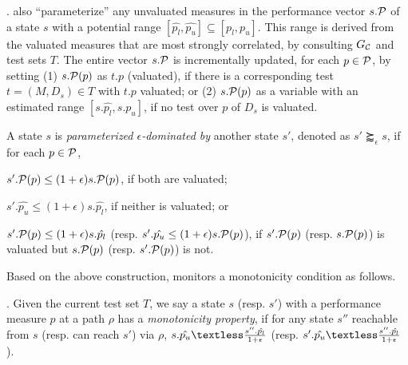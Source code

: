 


. 
\bimodis also ``parameterize'' any unvaluated measures in the performance vector $s.\P$ 
of a state $s$ with a potential range $[\hat{p_l}, \hat{p_u}]\subseteq [p_l, p_u]$. This range is derived from the 
valuated measures that are most strongly correlated, by consulting $G_\C$ and test sets $T$. 
The entire vector $s.\P$ is incrementally 
updated, for each $p\in \P$, by setting 
(1) $s.\P(p)$ as $t.p$ (valuated), if there is a corresponding test $t=(M, D_s)\in T$ with $t.p$ valuated; or (2) $s.\P(p)$ as a variable with an estimated range $[s.\hat{p_l}, s.\hat{p_u}]$, if no test over $p$ of $D_s$ is valuated.
 
A state $s$ is {\em parameterized $\epsilon$-dominated by} another state $s'$, denoted as $s' \succapprox_{\epsilon} s$,  if for each $p \in \P$, 
\tbi
\item $s'.\P(p)\leq (1+\epsilon) s.\P(p)$, if both 
are valuated; 
\item $s'.\hat{p_u} \leq (1+\epsilon) s.\hat{p_l}$, if neither 
is valuated; or
\item $s'.\P(p) \leq (1+\epsilon) s.\hat{p_l}$ 
(resp. $s'.\hat{p_u} \leq (1+\epsilon) s.\P(p)$), 
if $s'.\P(p)$ (resp. $s.\P(p)$) is valuated but 
$s.\P(p)$ (resp. $s'.\P(p)$) is not. 
\ei

Based on the above construction, \bimodis 
monitors a monotonicity condition as follows. 

. 
Given the current test set $T$, we say a state $s$ (resp. $s'$) with  
a performance measure $p$ at a path $\rho$ 
has a {\em monotonicity property}, if for 
any state $s''$ reachable from $s$ (resp. can reach $s'$) via $\rho$, 
$s.\hat{p_u}\textless \frac{s''.\hat{p_l}}{1+\epsilon}$ (resp. $s'.\hat{p_u}\textless \frac{s''.\hat{p_l}}{1+\epsilon}$). 

